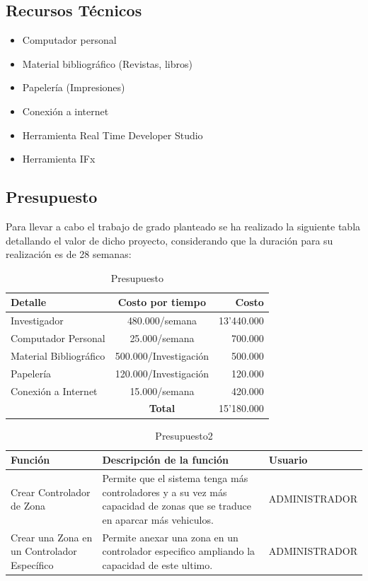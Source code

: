 \subsection{Recursos T\'ecnicos}

\begin{itemize}
 \item Computador personal
 \item Material bibliogr\'afico (Revistas, libros)
 \item Papeler\'ia (Impresiones)
\item Conexi\'on a internet
\item Herramienta Real Time Developer Studio 
\item Herramienta IFx
\end{itemize}

\subsection{Presupuesto}

Para llevar a cabo el trabajo de grado planteado se ha realizado la siguiente 
tabla detallando el valor de dicho proyecto, considerando que la duraci\'on para 
su realizaci\'on es de 28  semanas:

\begin{table}[H]
  \centering
  \begin{tabular}{|l|c|r|}
    \hline \hline
    \textbf{Detalle} & \textbf{Costo por tiempo} & \textbf{Costo} \\ 
    \hline
    Investigador                   & 480.000/semana & 13'440.000 \\ \hline
    Computador Personal            & 25.000/semana & 700.000\\ \hline
    Material Bibliogr\'afico       & 500.000/Investigaci\'on & 500.000\\ \hline
    Papeler\'ia  & 120.000/Investigaci\'on & 120.000\\ \hline
    Conexi\'on a Internet & 15.000/semana& 420.000 \\ \hline
    \hline
    \hfill &  \textbf{Total}           & 15'180.000 \\
    \hline
  \end{tabular}
  \caption{Presupuesto}
  \label{tab:presupuesto}
\end{table}

\begin{table}[H]
	\centering
	\begin{tabular}{|p{5cm}|p{8cm}|p{3cm}|}
	\hline 
	Funci\'on & Descripci\'on de la función & Usuario \\ 
	\hline 
	Crear Controlador de Zona & Permite que el sistema tenga m\'as controladores y a su vez m\'as 	capacidad de zonas que se traduce en aparcar m\'as vehiculos. & ADMINISTRADOR \\ 
	\hline 
	Crear una Zona en un Controlador Específico & Permite anexar una zona en un controlador especifico 	ampliando la capacidad de este ultimo. & ADMINISTRADOR \\ 
	\hline 
	\end{tabular} 
	\caption{Presupuesto2}
  	\label{tab:presupuesto2}
\end{table}
